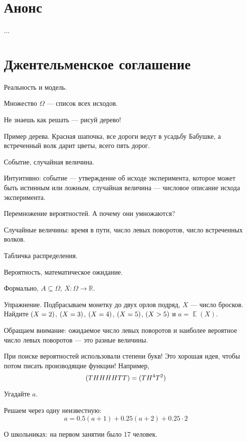 \documentclass[12pt]{article}
\DeclareMathOperator{\E}{\mathbb{E}}
\let\P\relax
\DeclareMathOperator{\P}{\mathbb{P}}
\theoremstyle{definition}
\begin{document}
\tableofcontents{}

\section*{Анонс}
...

\newpage
\setcounter{section}{0}

\section{Джентельменское соглашение}

Реальность и модель. 

Множество $\Omega$ — список всех исходов. 

Не знаешь как решать — рисуй дерево!

Пример дерева. Красная шапочка, все дороги ведут в усадьбу Бабушке, а встреченный волк дарит цветы, всего пять дорог.

Событие, случайная величина. 

Интуитивно: событие — утверждение об исходе эксперимента, которое может быть истинным или ложным, случайная величина — числовое описание исхода эксперимента.

Перемножение вероятностей. А почему они умножаются?

Случайные величины: время в пути, число левых поворотов, число встреченных волков. 

Табличка распределения. 

Вероятность, математическое ожидание. 

Формально, $A \subseteq \Omega$, $X : \Omega \to \mathbb R$.

Упражнение. Подбрасываем монетку до двух орлов подряд, $X$ — число бросков. 
Найдите $\P(X=2)$, $\P(X=3)$, $\P(X=4)$, $\P(X=5)$, $\P(X>5)$ и $a=\E(X)$.

Обращаем внимание: ожидаемое число левых поворотов и наиболее вероятное число левых поворотов — это разные величины.

При поиске вероятностей использовали степени букв! Это хорошая идея, чтобы потом писать производящие функции!
Например,
\[
\P(THHHHTT) = \P(TH^4T^2)  
\]

Угадайте $a$. 

Решаем через одну неизвестную:
\[
a = 0.5(a + 1) + 0.25(a + 2) + 0.25 \cdot 2  
\]

О школьниках: на первом занятии было 17 человек. 

\section{}
\end{document}
